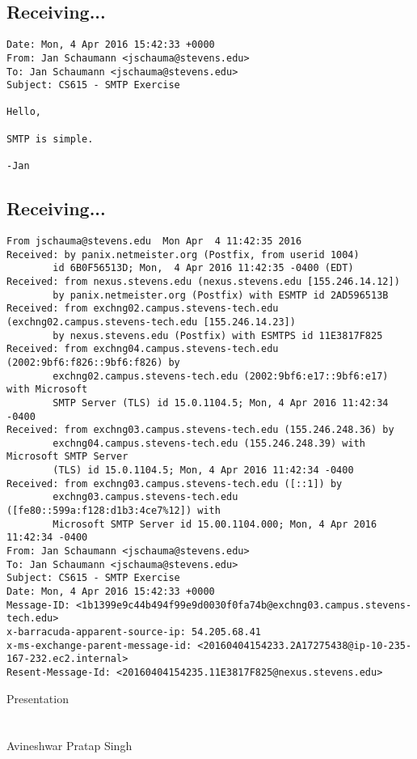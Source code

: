 \documentclass[xga]{xdvislides}
\newcommand{\smallish}{\fontsize{16}{16}\selectfont}
\begin{document}
\subsection{Receiving...}
\begin{verbatim}
Date: Mon, 4 Apr 2016 15:42:33 +0000
From: Jan Schaumann <jschauma@stevens.edu>
To: Jan Schaumann <jschauma@stevens.edu>
Subject: CS615 - SMTP Exercise

Hello,

SMTP is simple.

-Jan
\end{verbatim}

\subsection{Receiving...}
\smallish
\begin{verbatim}
From jschauma@stevens.edu  Mon Apr  4 11:42:35 2016
Received: by panix.netmeister.org (Postfix, from userid 1004)
        id 6B0F56513D; Mon,  4 Apr 2016 11:42:35 -0400 (EDT)
Received: from nexus.stevens.edu (nexus.stevens.edu [155.246.14.12])
        by panix.netmeister.org (Postfix) with ESMTP id 2AD596513B
Received: from exchng02.campus.stevens-tech.edu (exchng02.campus.stevens-tech.edu [155.246.14.23])
        by nexus.stevens.edu (Postfix) with ESMTPS id 11E3817F825
Received: from exchng04.campus.stevens-tech.edu (2002:9bf6:f826::9bf6:f826) by
        exchng02.campus.stevens-tech.edu (2002:9bf6:e17::9bf6:e17) with Microsoft
        SMTP Server (TLS) id 15.0.1104.5; Mon, 4 Apr 2016 11:42:34 -0400
Received: from exchng03.campus.stevens-tech.edu (155.246.248.36) by
        exchng04.campus.stevens-tech.edu (155.246.248.39) with Microsoft SMTP Server
        (TLS) id 15.0.1104.5; Mon, 4 Apr 2016 11:42:34 -0400
Received: from exchng03.campus.stevens-tech.edu ([::1]) by
        exchng03.campus.stevens-tech.edu ([fe80::599a:f128:d1b3:4ce7%12]) with
        Microsoft SMTP Server id 15.00.1104.000; Mon, 4 Apr 2016 11:42:34 -0400
From: Jan Schaumann <jschauma@stevens.edu>
To: Jan Schaumann <jschauma@stevens.edu>
Subject: CS615 - SMTP Exercise
Date: Mon, 4 Apr 2016 15:42:33 +0000
Message-ID: <1b1399e9c44b494f99e9d0030f0fa74b@exchng03.campus.stevens-tech.edu>
x-barracuda-apparent-source-ip: 54.205.68.41
x-ms-exchange-parent-message-id: <20160404154233.2A17275438@ip-10-235-167-232.ec2.internal>
Resent-Message-Id: <20160404154235.11E3817F825@nexus.stevens.edu>
\end{verbatim}

\newpage
\vspace*{\fill}
\begin{center}
    \Hugesize
        Presentation \\ [1em]
    \hspace*{5mm}
    \blueline\\
    \hspace*{5mm}\\
	Avineshwar Pratap Singh
\end{center}
\vspace*{\fill}
\end{document}
